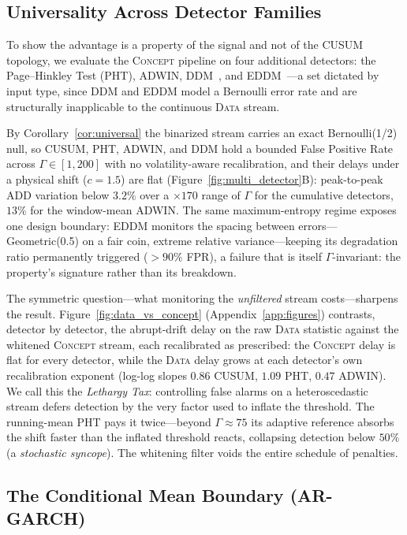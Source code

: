 \documentclass[sigconf,anonymous,review]{acmart}
\theoremstyle{acmdefinition}
\begin{document}
\subsection{Universality Across Detector Families}\label{sec:universality}

To show the advantage is a property of the signal and not of the CUSUM topology, we evaluate the \textsc{Concept} pipeline on four additional detectors: the Page--Hinkley Test (PHT), ADWIN, DDM~\cite{gama_2004_ddm}, and EDDM~\cite{baena_2006_eddm}---a set dictated by input type, since DDM and EDDM model a Bernoulli error rate and are structurally inapplicable to the continuous \textsc{Data} stream.

By Corollary~\ref{cor:universal} the binarized stream carries an exact Bernoulli(1/2) null, so CUSUM, PHT, ADWIN, and DDM hold a bounded False Positive Rate across $\Gamma \in [1, 200]$ with no volatility-aware recalibration, and their delays under a physical shift ($c=1.5$) are flat (Figure~\ref{fig:multi_detector}B): peak-to-peak ADD variation below $3.2\%$ over a $\times 170$ range of $\Gamma$ for the cumulative detectors, $13\%$ for the window-mean ADWIN. The same maximum-entropy regime exposes one design boundary: EDDM monitors the spacing between errors---Geometric(0.5) on a fair coin, extreme relative variance---keeping its degradation ratio permanently triggered ($>90\%$ FPR), a failure that is itself $\Gamma$-invariant: the property's signature rather than its breakdown.

The symmetric question---what monitoring the \emph{unfiltered} stream costs---sharpens the result. Figure~\ref{fig:data_vs_concept} (Appendix~\ref{app:figures}) contrasts, detector by detector, the abrupt-drift delay on the raw \textsc{Data} statistic against the whitened \textsc{Concept} stream, each recalibrated as prescribed: the \textsc{Concept} delay is flat for every detector, while the \textsc{Data} delay grows at each detector's own recalibration exponent (log-log slopes $0.86$ CUSUM, $1.09$ PHT, $0.47$ ADWIN). We call this the \emph{Lethargy Tax}: controlling false alarms on a heteroscedastic stream defers detection by the very factor used to inflate the threshold. The running-mean PHT pays it twice---beyond $\Gamma \approx 75$ its adaptive reference absorbs the shift faster than the inflated threshold reacts, collapsing detection below $50\%$ (a \emph{stochastic syncope}). The whitening filter voids the entire schedule of penalties.

\subsection{The Conditional Mean Boundary (AR-GARCH)}\label{sec:ar_garch}
\end{document}
